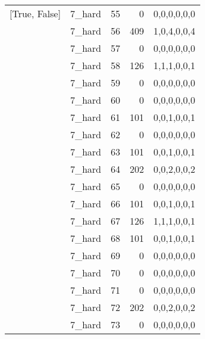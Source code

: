 \begin{tabular}{llrrl}
 [True, False]   & 7\_hard              &            55 &                     0 & 0,0,0,0,0,0   \\
 [True, False]   & 7\_hard              &            56 &                   409 & 1,0,4,0,0,4   \\
 [True, False]   & 7\_hard              &            57 &                     0 & 0,0,0,0,0,0   \\
 [True, False]   & 7\_hard              &            58 &                   126 & 1,1,1,0,0,1   \\
 [True, False]   & 7\_hard              &            59 &                     0 & 0,0,0,0,0,0   \\
 [True, False]   & 7\_hard              &            60 &                     0 & 0,0,0,0,0,0   \\
 [True, False]   & 7\_hard              &            61 &                   101 & 0,0,1,0,0,1   \\
 [True, False]   & 7\_hard              &            62 &                     0 & 0,0,0,0,0,0   \\
 [True, False]   & 7\_hard              &            63 &                   101 & 0,0,1,0,0,1   \\
 [True, False]   & 7\_hard              &            64 &                   202 & 0,0,2,0,0,2   \\
 [True, False]   & 7\_hard              &            65 &                     0 & 0,0,0,0,0,0   \\
 [True, False]   & 7\_hard              &            66 &                   101 & 0,0,1,0,0,1   \\
 [True, False]   & 7\_hard              &            67 &                   126 & 1,1,1,0,0,1   \\
 [True, False]   & 7\_hard              &            68 &                   101 & 0,0,1,0,0,1   \\
 [True, False]   & 7\_hard              &            69 &                     0 & 0,0,0,0,0,0   \\
 [True, False]   & 7\_hard              &            70 &                     0 & 0,0,0,0,0,0   \\
 [True, False]   & 7\_hard              &            71 &                     0 & 0,0,0,0,0,0   \\
 [True, False]   & 7\_hard              &            72 &                   202 & 0,0,2,0,0,2   \\
 [True, False]   & 7\_hard              &            73 &                     0 & 0,0,0,0,0,0   \\

\end{tabular}
